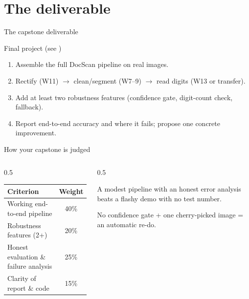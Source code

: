 \documentclass[10pt,aspectratio=169]{beamer}
\begin{document}
\section{The deliverable}

\begin{frame}{The capstone deliverable}
  \begin{alertblock}{Final project (see )}
    \begin{enumerate}
      \item Assemble the full DocScan pipeline on real  images.
      \item Rectify (W11) $\rightarrow$ clean/segment (W7--9) $\rightarrow$ read digits (W13 or transfer).
      \item Add at least two robustness features (confidence gate, digit-count check, fallback).
      \item Report end-to-end accuracy and where it fails; propose one concrete improvement.
    \end{enumerate}
  \end{alertblock}
\end{frame}

\begin{frame}{How your capstone is judged}
  \begin{columns}[T]
    \begin{column}{0.5\textwidth}
      \begin{tabular}{@{}lc@{}}
        \toprule
        \textbf{Criterion} & \textbf{Weight} \\
        \midrule
        Working end-to-end pipeline & 40\% \\
        Robustness features (2+) & 20\% \\
        Honest evaluation \& failure analysis & 25\% \\
        Clarity of report \& code & 15\% \\
        \bottomrule
      \end{tabular}
    \end{column}
    \begin{column}{0.5\textwidth}
      \begin{goodbox}
        A modest pipeline with an honest error analysis beats a flashy demo with no test number.
      \end{goodbox}
      \begin{badbox}
        No confidence gate + one cherry-picked image = an automatic re-do.
      \end{badbox}
    \end{column}
  \end{columns}
\end{frame}
\end{document}
